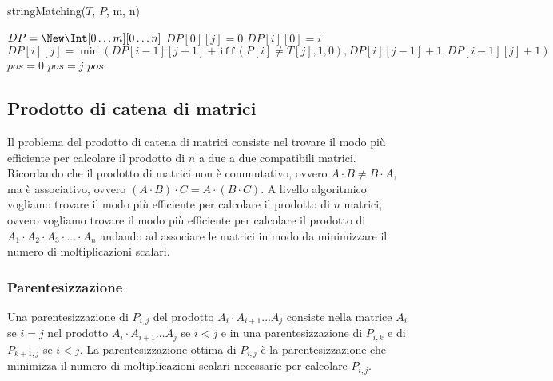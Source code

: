             \begin{algorithm}[H]
                \caption{\Int stringMatching(\Item[] $T$, \Item[] $P$, \Int m, \Int n)}
                \begin{algorithmic}
                    \State \Int[][] $DP = \New \Int[0\dots m][0\dots n]$
                        \State $DP[0][j]=0$
                    \EndFor
                        \State $DP[i][0]=i$
                    \EndFor
                            \State $DP[i][j] = \min\left( DP[i-1][j-1] + \texttt{iff}(P[i]\neq T[j], 1, 0), DP[i][j-1]+1, DP[i-1][j]+1\right)$
                        \EndFor
                    \EndFor
                    \State \Int $pos = 0$
                            \State $pos=j$
                        \EndIf
                    \EndFor
                    \State \Return $pos$
                \end{algorithmic}
            \end{algorithm}
            \subsection{Prodotto di catena di matrici}
                Il problema del prodotto di catena di matrici consiste nel trovare il modo più efficiente per calcolare il prodotto di $n$ a due a due compatibili matrici. Ricordando che il prodotto di matrici non è commutativo, ovvero $A\cdot B\neq B\cdot A$, ma è associativo, ovvero $(A\cdot B)\cdot C=A\cdot(B\cdot C)$.\newline
                A livello algoritmico vogliamo trovare il modo più efficiente per calcolare il prodotto di $n$ matrici, ovvero vogliamo trovare il modo più efficiente per calcolare il prodotto di $A_1\cdot A_2\cdot A_3\cdot\dots\cdot A_n$ andando ad associare le matrici in modo da minimizzare il numero di moltiplicazioni scalari.
                \subsubsection{Parentesizzazione}
                Una parentesizzazione di $P_{i,j}$ del prodotto $A_i\cdot A_{i+1}\dots A_j$ consiste nella matrice $A_i$ se $i=j$ nel prodotto $A_i\cdot A_{i+1}\dots A_j$ se $i<j$ e in una parentesizzazione di $P_{i,k}$ e di $P_{k+1,j}$ se $i<j$.
                La parentesizzazione ottima di $P_{i,j}$ è la parentesizzazione che minimizza il numero di moltiplicazioni scalari necessarie per calcolare $P_{i,j}$.
